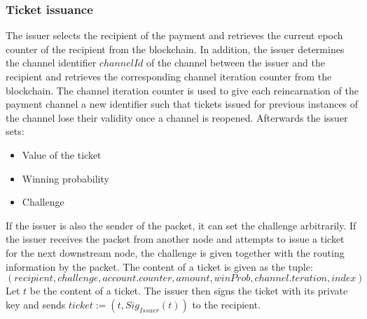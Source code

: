 \subsubsection{Ticket issuance}
The issuer selects the recipient of the payment and retrieves the current epoch counter of the recipient from the blockchain. 
In addition, the issuer determines the channel identifier $channelId$ of the channel between the issuer and the recipient and retrieves the corresponding channel iteration counter from the blockchain. 
The channel iteration counter is used to give each reincarnation of the payment channel a new identifier such that tickets issued for previous instances of the channel lose their validity once a channel is reopened.
\newline Afterwards the issuer sets:
\begin{itemize}
    \item Value of the ticket
    \item Winning probability
    \item Challenge
\end{itemize}
If the issuer is also the sender of the packet, it can set the challenge arbitrarily. 
If the issuer receives the packet from another node and attempts to issue a ticket for the next downstream node, the challenge is given together with the routing information by the packet.
The content of a ticket is given as the tuple:$(recipient, challenge, account.counter, amount, winProb, channel.teration, index)$ 
Let $t$ be the content of a ticket. The issuer then signs the ticket with its private key and sends $ticket:= (t, Sig_{Issuer}(t))$ to the recipient.

